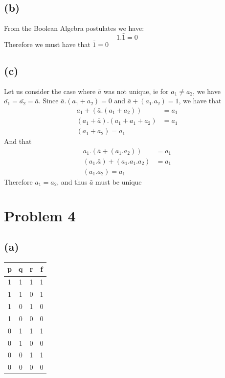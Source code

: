 \documentclass[12pt]{article}
\begin{document}
\subsection*{(b)}
From the Boolean Algebra postulates we have: 
$$1.\bar{1}=0$$
Therefore we must have that $\bar{1}=0$
\subsection*{(c)}
Let us consider the case where $\bar{a}$ was not unique, ie for $a_1\neq a_2$, we have
$\bar{a_1}=\bar{a_2}=\bar{a}$. Since $\bar{a}.(a_1+a_2)=0$ and $\bar{a}+(a_1.a_2)=1$, we
have that 
\begin{align*}
    a_1+(\bar{a}.(a_1+a_2))&=a_1\\
    (a_1+\bar{a}).(a_1+a_1+a_2)&=a_1\\
    (a_1+a_2)=a_1
\end{align*}
And that 
\begin{align*}
    a_1.(\bar{a}+(a_1.a_2))&=a_1\\
    (a_1.\bar{a})+(a_1.a_1.a_2)&=a_1\\
    (a_1.a_2)=a_1
\end{align*}
Therefore $a_1=a_2$, and thus $\bar{a}$ must be unique
\section*{Problem 4}
\subsection*{(a)}
\begin{center}
    \begin{tabular}{ |c|c|c||c| }
        p & q & r  & f\\
        \hline
        1 & 1 & 1 & 1\\
        \hline
        1 & 1 & 0 & 1\\
        \hline
        1 & 0 & 1 & 0\\
        \hline
        1 & 0 & 0 & 0\\
        \hline
        0 & 1 & 1 & 1\\
        \hline
        0 & 1 & 0 & 0\\
        \hline
        0 & 0 & 1 & 1\\
        \hline
        0 & 0 & 0 & 0\\
        \hline

    \end{tabular}
\end{center}
\end{document}
